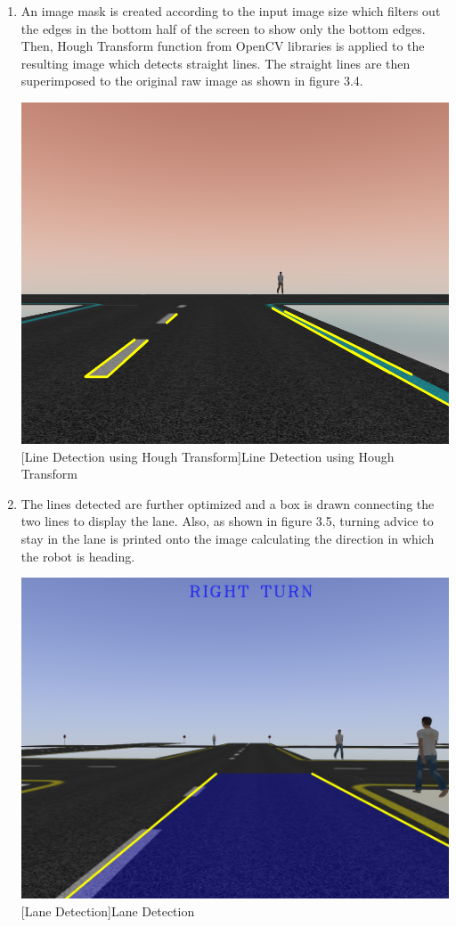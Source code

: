 \documentclass[%
xelatex,
	oneside,		%
	12pt,			%
	parskip=half,	%
	abstracton,
	chapterprefix=true%
    appendixprefix=true]
{scrbook}
\begin{document}
\begin{enumerate}
\begin{center}
[Canny Edge Detection]{Canny Edge Detection}
\label{fig:canny}
\end{center}
\item An image mask is created according to the input image size which filters out the edges in the bottom half of the screen to show only the bottom edges. Then, Hough Transform function from OpenCV libraries is applied to the resulting image which detects straight lines. The straight lines are then superimposed to the original raw image as shown in figure 3.4.
\begin{center}
\includegraphics[scale=0.3]{fig/hough.png}
[Line Detection using Hough Transform]{Line Detection using Hough Transform}
\label{fig:hough}
\end{center}
\item The lines detected are further optimized and a box is drawn connecting the two lines to display the lane. Also, as shown in figure 3.5, turning advice to stay in the lane is printed onto the image calculating the direction in which the robot is heading.
\begin{center}
\includegraphics[scale=0.3]{fig/finaladas.png}
[Lane Detection]{Lane Detection}
\label{fig:lane}
\end{center}
	\end{enumerate}
		
\end{document}
